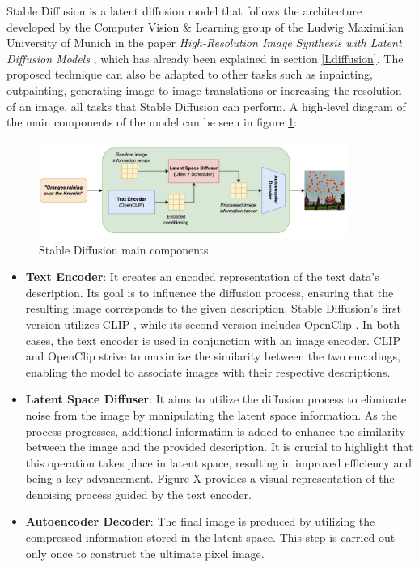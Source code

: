 Stable Diffusion is a latent diffusion model that follows the architecture developed by the Computer Vision \& Learning group of the Ludwig Maximilian University of Munich in the paper \textit{High-Resolution Image Synthesis with Latent Diffusion Models} \cite{rombach2022high}, which has already been explained in section \ref{Ldiffusion}. The proposed technique can also be adapted to other tasks such as inpainting, outpainting, generating image-to-image translations or increasing the resolution of an image, all tasks that Stable Diffusion can perform. A high-level diagram of the main components of the model can be seen in figure \ref{fig:SDdiagram}:

\begin{figure}
    \centering
    \includegraphics[width=0.9\textwidth]{Pictures/SDdiagram.png} 
    \caption{Stable Diffusion main components}
    \label{fig:SDdiagram}
\end{figure}

\begin{itemize}
    \item \textbf{Text Encoder}: It creates an encoded representation of the text data's description. Its goal is to influence the diffusion process, ensuring that the resulting image corresponds to the given description. Stable Diffusion's first version utilizes CLIP \cite{radford2021learning}, while its second version includes OpenClip \cite{cherti2022reproducible}. In both cases, the text encoder is used in conjunction with an image encoder. CLIP and OpenClip strive to maximize the similarity between the two encodings, enabling the model to associate images with their respective descriptions.
    \item \textbf{Latent Space Diffuser}: It aims to utilize the diffusion process to eliminate noise from the image by manipulating the latent space information. As the process progresses, additional information is added to enhance the similarity between the image and the provided description. It is crucial to highlight that this operation takes place in latent space, resulting in improved efficiency and being a key advancement. Figure X provides a visual representation of the denoising process guided by the text encoder.
    \item \textbf{Autoencoder Decoder}: The final image is produced by utilizing the compressed information stored in the latent space. This step is carried out only once to construct the ultimate pixel image.
\end{itemize}

